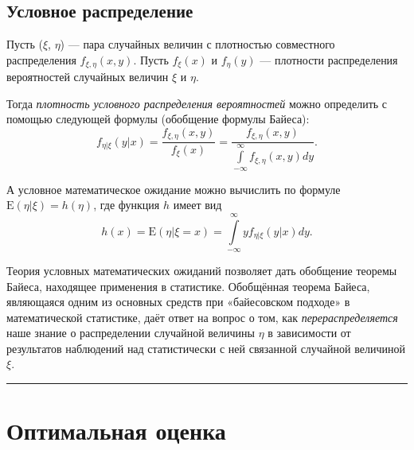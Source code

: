 \documentclass[11pt,a4paper]{article}
\begin{document}
    \begin{center}
    \end{center}

    \hypertarget{ux443ux441ux43bux43eux432ux43dux43eux435-ux440ux430ux441ux43fux440ux435ux434ux435ux43bux435ux43dux438ux435}{%
\subsection{Условное
распределение}\label{ux443ux441ux43bux43eux432ux43dux43eux435-ux440ux430ux441ux43fux440ux435ux434ux435ux43bux435ux43dux438ux435}}

Пусть (\(\xi\), \(\eta\)) --- пара случайных величин с плотностью
совместного распределения \(f_{\xi,\eta}(x, y)\). Пусть \(f_{\xi}(x)\) и
\(f_{\eta}(y)\) --- плотности распределения вероятностей случайных
величин \(\xi\) и \(\eta\).

Тогда \emph{плотность условного распределения вероятностей} можно
определить с помощью следующей формулы (обобщение формулы Байеса): \[
  f_{\eta|\xi}(y|x) = \frac{f_{\xi,\eta}(x, y)}{f_{\xi}(x)} = \frac{f_{\xi,\eta}(x, y)}{\int\limits_{-\infty}^{\infty} f_{\xi,\eta}(x,y) dy}.
\]

А условное математическое ожидание можно вычислить по формуле
\(\mathrm{E}(\eta|\xi) = h(\eta)\), где функция \(h\) имеет вид \[
  h(x) = \mathrm{E}(\eta|\xi=x) = \int\limits_{-\infty}^{\infty} y f_{\eta|\xi}(y|x) dy.
\]

    Теория условных математических ожиданий позволяет дать обобщение теоремы
Байеса, находящее применения в статистике. Обобщённая теорема Байеса,
являющаяся одним из основных средств при «байесовском подходе» в
математической статистике, даёт ответ на вопрос о том, как
\emph{перераспределяется} наше знание о распределении случайной величины
\(\eta\) в зависимости от результатов наблюдений над статистически с ней
связанной случайной величиной \(\xi\).

    \begin{center}\rule{0.5\linewidth}{0.5pt}\end{center}

    \hypertarget{ux43eux43fux442ux438ux43cux430ux43bux44cux43dux430ux44f-ux43eux446ux435ux43dux43aux430}{%
\section{Оптимальная
оценка}\label{ux43eux43fux442ux438ux43cux430ux43bux44cux43dux430ux44f-ux43eux446ux435ux43dux43aux430}}
\end{document}

